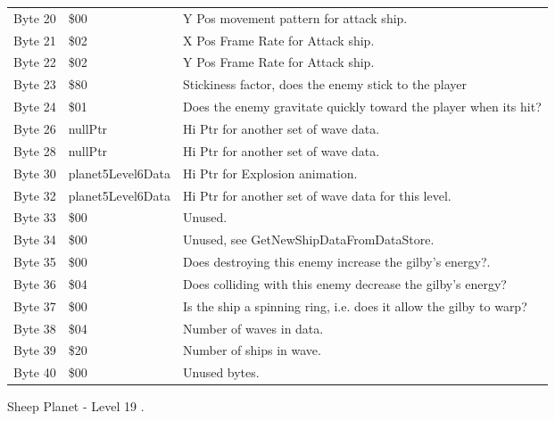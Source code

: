 \begin{figure}[H]
{\begin{adjustbox}{width=12cm}
\begin{tabular}{lll}
 Byte 20 & \$00                & Y Pos movement pattern for attack ship.                            \\
 Byte 21 & \$02                & X Pos Frame Rate for Attack ship.                                  \\
 Byte 22 & \$02                & Y Pos Frame Rate for Attack ship.                                  \\
 Byte 23 & \$80                & Stickiness factor, does the enemy stick to the player              \\
 Byte 24 & \$01                & Does the enemy gravitate quickly toward the player when its hit?   \\
 Byte 26 & nullPtr            & Hi Ptr for another set of wave data.                               \\
 Byte 28 & nullPtr            & Hi Ptr for another set of wave data.                               \\
 Byte 30 & planet5Level6Data  & Hi Ptr for Explosion animation.                                    \\
 Byte 32 & planet5Level6Data  & Hi Ptr for another set of wave data for this level.                \\
 Byte 33 & \$00                & Unused.                                                            \\
 Byte 34 & \$00                & Unused, see GetNewShipDataFromDataStore.                           \\
 Byte 35 & \$00                & Does destroying this enemy increase the gilby's energy?.           \\
 Byte 36 & \$04                & Does colliding with this enemy decrease the gilby's energy?        \\
 Byte 37 & \$00                & Is the ship a spinning ring, i.e. does it allow the gilby to warp? \\
 Byte 38 & \$04                & Number of waves in data.                                           \\
 Byte 39 & \$20                & Number of ships in wave.                                           \\
 Byte 40 & \$00                & Unused bytes.                                                      \\
\bottomrule
\end{tabular}

  \end{adjustbox}

  }\caption*{Sheep Planet - Level 19
.}
\end{figure}

